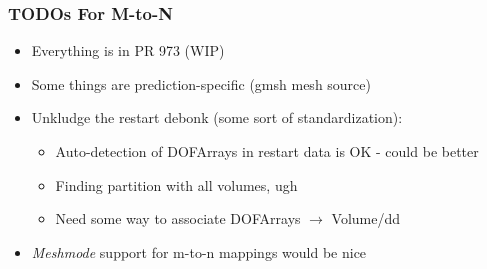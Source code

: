 \begin{frame}\frametitle{TODOs For M-to-N}
  \begin{itemize}
  \item Everything is in \mirgecom{} PR 973 (WIP)
  \item Some things are prediction-specific (gmsh mesh source)
  \item Unkludge the restart debonk (some sort of standardization):
    \begin{itemize}
    \item Auto-detection of DOFArrays in restart data is OK - could be better
    \item Finding partition with all volumes, ugh
    \item Need some way to associate DOFArrays $\rightarrow$ Volume/dd
    \end{itemize}
  \item \textit{Meshmode} support for m-to-n mappings would be nice 
  \end{itemize}
\end{frame}
